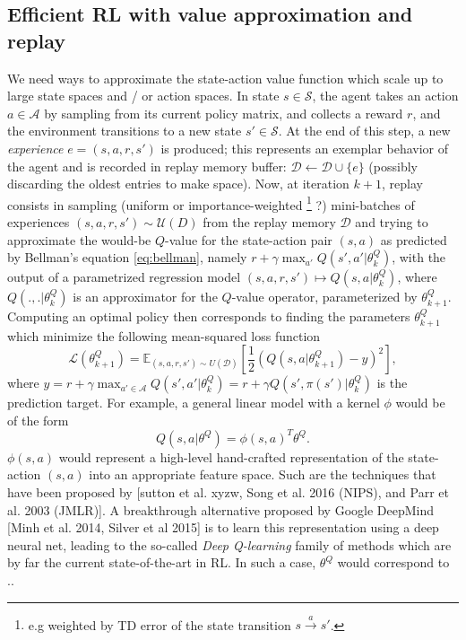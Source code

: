 \documentclass{article} %
\begin{document}
\subsection{Efficient RL with value approximation and replay}
We need ways to approximate the state-action value function
which scale up to large state spaces and / or action spaces.
In state $s \in \mathcal S$, the agent takes an action $a \in \mathcal A$
by sampling from its current policy matrix, and collects a reward $r$,
and the environment transitions to a new state $s' \in \mathcal S$. At the end of
this step, a new \textit{experience} $e = (s,a,r,s')$ is produced; this represents an exemplar
behavior of the agent and is recorded in replay memory buffer:
$\mathcal D \leftarrow \mathcal D \cup \{e\}$ (possibly discarding the oldest entries to make space).
Now, at iteration $k+1$, replay consists in sampling (uniform or importance-weighted
\footnote{e.g weighted by TD error of the state transition $s \overset{a}{\rightarrow} s'$.} ?)  mini-batches of experiences
$(s, a, r, s') \sim \mathcal U(D)$ from the replay memory $\mathcal D$ and trying to
approximate
the would-be $Q$-value for the state-action pair $(s,a)$ as predicted by Bellman's equation \eqref{eq:bellman}, namely
$r + \gamma \max_{a'} Q(s', a'|\theta^Q_k)$, with the output of a parametrized regression model $(s,a,r,s')
\mapsto {Q}(s, a|\theta^Q_{k})$, where $Q(.,.|\theta^Q_{k})$ is an approximator for the $Q$-value operator,  parameterized by $\theta^Q_{k+1}$.
Computing an optimal policy then corresponds to finding the parameters $\theta^Q_{k+1}$ which minimize the following mean-squared loss function
\begin{equation}
  \mathcal L(\theta^Q_{k+1})
  = \mathbb E_{(s, a, r, s') \sim U(\mathcal D)}\left[\frac{1}{2}(Q(s, a|\theta^Q_{k+1}) - y)^2\right],
  \label{eq:oracle}
\end{equation}
where
$ y = r + \gamma \max_{a' \in \mathcal A} Q(s', a'|\theta^Q_k) = r + \gamma Q(s', \pi(s')|\theta^Q_k)$ is the prediction target.
For example, a general linear model with a kernel $\phi$ would be of the
form
$${Q}(s, a|\theta^Q) = \phi(s,a)^T\theta^Q.$$
$\phi(s,a)$ would represent a high-level hand-crafted representation of the state-action $(s,a)$ into an appropriate
feature space. Such are the techniques that have been proposed by [sutton et al. xyzw, Song et al. 2016 (NIPS),
  and Parr et al. 2003 (JMLR)].
A breakthrough alternative proposed by Google DeepMind [Minh et al. 2014, Silver et al 2015] is to learn this
representation using a deep neural net, leading to the so-called \textit{Deep Q-learning} family of methods which
are by far the current state-of-the-art in RL. In such a case, $\theta^Q$ would correspond to ..
\end{document}
